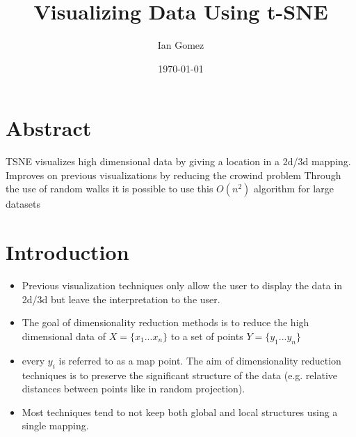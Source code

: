 \documentclass[11pt]{article}
\author{Ian Gomez}
\date{\today}
\title{Visualizing Data Using t-SNE}
\begin{document}
\maketitle
\tableofcontents


\section{Abstract}
\label{sec:org90bb8c3}
TSNE visualizes high dimensional data by giving a location in a 2d/3d mapping.
Improves on previous visualizations by reducing the crowind problem
Through the use of random walks it is possible to use this \(O(n^2)\) algorithm for large datasets
\section{Introduction}
\label{sec:org011a839}
\begin{itemize}
\item Previous visualization techniques only allow the user to display the data in 2d/3d but leave the interpretation to the user.
\item The goal of dimensionality reduction methods is to reduce the high dimensional data of \(X = \{x_1...x_n\}\) to a set of points \(Y = \{y_1...y_n\}\)
\item every \(y_i\) is referred to as a map point. The aim of dimensionality reduction techniques is to preserve the significant structure of the data (e.g. relative distances between points like in random projection).
\item Most techniques tend to not keep both global and local structures using a single mapping.
\end{itemize}
\end{document}

